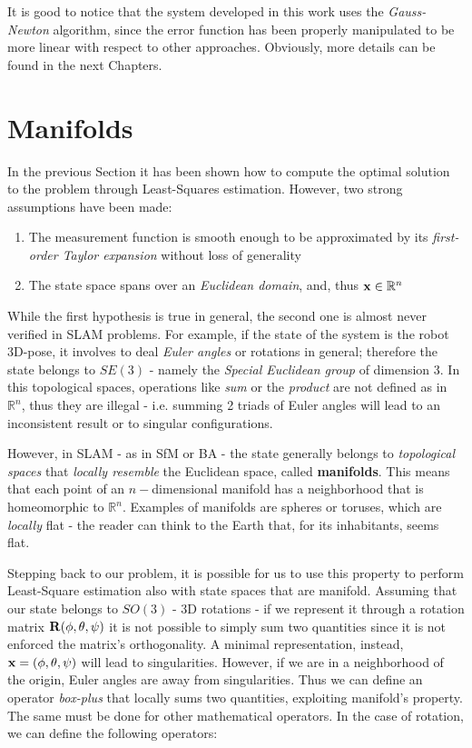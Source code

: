 It is good to notice that the system developed in this work uses the \textit{Gauss-Newton} algorithm, since the error function has been properly manipulated to be more linear with respect to other approaches. Obviously, more details can be found in the next Chapters.

\section{Manifolds}
In the previous Section it has been shown how to compute the optimal solution to the problem through Least-Squares estimation. However, two strong assumptions have been made:

\begin{enumerate}
    \item The measurement function is smooth enough to be approximated by its \textit{first-order Taylor expansion} without loss of generality
    \item The state space spans over an \textit{Euclidean domain}, and, thus $\mathbf{x} \in \mathbb{R}^n$
\end{enumerate}


\noindent While the first hypothesis is true in general, the second one is almost never verified in SLAM problems. For example, if the state of the system is the robot 3D-pose, it involves to deal \textit{Euler angles} or rotations in general; therefore the state belongs to $SE(3)$ - namely the \textit{Special Euclidean group} of dimension 3. In this topological spaces, operations like \textit{sum} or the \textit{product} are not defined as in $\mathbb{R}^n$, thus they are illegal - i.e. summing 2 triads of Euler angles will lead to an inconsistent result or to singular configurations.

However, in SLAM - as in SfM or BA - the state generally belongs to \textit{topological spaces} that \textit{locally resemble} the Euclidean space, called \textbf{manifolds}. This means that each point of an $n-$dimensional manifold has a neighborhood that is homeomorphic to $\mathbb{R}^n$. Examples of manifolds are spheres or toruses, which are \textit{locally} flat - the reader can think to the Earth that, for its inhabitants, seems flat.

Stepping back to our problem, it is possible for us to use this property to perform Least-Square estimation also with state spaces that are manifold. Assuming that our state belongs to $SO(3)$ - 3D rotations - if we represent it through a rotation matrix $\mathbf{R}(\phi, \theta, \psi)$ it is not possible to simply sum two quantities since it is not enforced the matrix's orthogonality. A minimal representation, instead, $\mathbf{x} = (\phi, \theta, \psi)$ will lead to singularities. However, if we are in a neighborhood of the origin, Euler angles are away from singularities. Thus we can define an operator \textit{box-plus} that locally sums two quantities, exploiting manifold's property. The same must be done for other mathematical operators. In the case of rotation, we can define the following operators:

